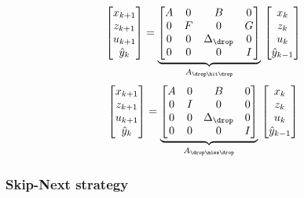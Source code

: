 \begin{equation}
    \begin{bmatrix}
        x_{k+1} \\
        z_{k+1} \\
        u_{k+1} \\
        \hat y_{k} \\
    \end{bmatrix} = \underbrace{\begin{bmatrix}
        A & 0 & B & 0 \\
        0 & F & 0 & G \\
        0 & 0 & \Delta_\drop & 0 \\
        0 & 0 & 0 & I
    \end{bmatrix}}_{A_{\drop\hit\drop}}\, \begin{bmatrix}
        x_{k} \\
        z_{k} \\
        u_{k} \\
        \hat y_{k-1} \\
    \end{bmatrix}
\end{equation}
%
\begin{equation}
    \begin{bmatrix}
        x_{k+1} \\
        z_{k+1} \\
        u_{k+1} \\
        \hat y_{k} \\
    \end{bmatrix} = \underbrace{\begin{bmatrix}
        A & 0 & B & 0 \\
        0 & I & 0 & 0 \\
        0 & 0 & \Delta_\drop & 0 \\
        0 & 0 & 0 & I
    \end{bmatrix}}_{A_{\drop\miss\drop}}\, \begin{bmatrix}
        x_{k} \\
        z_{k} \\
        u_{k} \\
        \hat y_{k-1} \\
    \end{bmatrix}
\end{equation}

\newpage

\subsubsection{Skip-Next strategy}%

